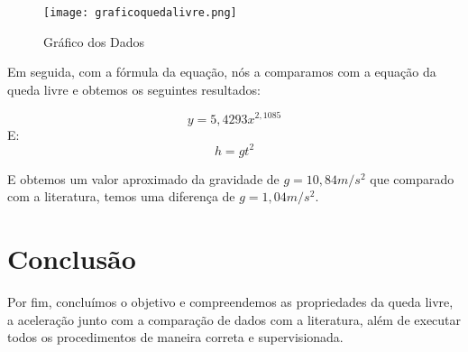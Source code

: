 \documentclass[a4paper, 12pt]{article}
\begin{document}
\begin{figure}[ht]
\centering 
\texttt{[image: graficoquedalivre.png]} 
\caption{Gráfico dos Dados} 
\label{Fig02} 
\end{figure}
\pagebreak

Em seguida, com a fórmula da equação, nós a comparamos com a equação da queda livre e obtemos os seguintes resultados:

\begin{equation}
     y= 5,4293x^{2, 1085} 
\end{equation}
E:
\begin{equation}
     h = gt^{2}
\end{equation}

E obtemos um valor aproximado da gravidade de $g = 10,84m/s^{2}$ que comparado com a literatura, temos uma diferença de $g = 1,04m/s^{2}$.

\section{Conclusão}
Por fim, concluímos o objetivo e compreendemos as propriedades da queda livre, a aceleração junto com a comparação de dados com a literatura, além de executar todos os procedimentos de maneira correta e supervisionada.
\end{document}
